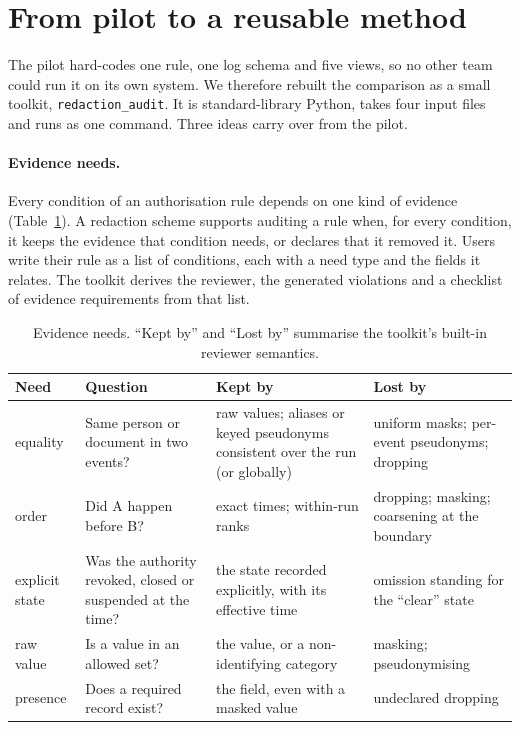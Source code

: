 \documentclass[11pt]{article}
\newcommand{\code}[1]{\texttt{#1}}
\begin{document}
\section{From pilot to a reusable method}
\label{sec:method}

The pilot hard-codes one rule, one log schema and five views, so no other team could run it on its own system. We therefore rebuilt the comparison as a small toolkit, \code{redaction\_audit}. It is standard-library Python, takes four input files and runs as one command. Three ideas carry over from the pilot.

\paragraph{Evidence needs.} Every condition of an authorisation rule depends on one kind of evidence (Table~\ref{tab:needs}). A redaction scheme supports auditing a rule when, for every condition, it keeps the evidence that condition needs, or declares that it removed it. Users write their rule as a list of conditions, each with a need type and the fields it relates. The toolkit derives the reviewer, the generated violations and a checklist of evidence requirements from that list.

\begin{table}[h]
\centering\small
\caption{Evidence needs. ``Kept by'' and ``Lost by'' summarise the toolkit's built-in reviewer semantics.}
\label{tab:needs}
\begin{tabular}{@{}p{2.1cm}p{4.1cm}p{4.1cm}p{3.6cm}@{}}
\toprule
Need & Question & Kept by & Lost by \\
\midrule
equality & Same person or document in two events? & raw values; aliases or keyed pseudonyms consistent over the run (or globally) & uniform masks; per-event pseudonyms; dropping \\
order & Did A happen before B? & exact times; within-run ranks & dropping; masking; coarsening at the boundary \\
explicit state & Was the authority revoked, closed or suspended at the time? & the state recorded explicitly, with its effective time & omission standing for the ``clear'' state \\
raw value & Is a value in an allowed set? & the value, or a non-identifying category & masking; pseudonymising \\
presence & Does a required record exist? & the field, even with a masked value & undeclared dropping \\
\bottomrule
\end{tabular}
\end{table}
\end{document}

